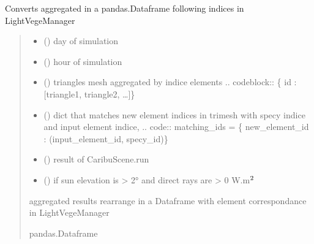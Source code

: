 \documentclass[letterpaper,10pt,english]{sphinxmanual}
\begin{document}
\begin{fulllineitems}
\label{\detokenize{reference:outputs.out_caribu_elements}}
\pysigstartsignatures
{}
\pysigstopsignatures
\sphinxAtStartPar
Converts aggregated in a pandas.Dataframe following indices in LightVegeManager
\begin{quote}\begin{description}
\begin{itemize}
\item {} 
\sphinxAtStartPar
{} () \textendash{} day of simulation

\item {} 
\sphinxAtStartPar
{} () \textendash{} hour of simulation

\item {} 
\sphinxAtStartPar
{} () \textendash{} triangles mesh aggregated by indice elements
.. code\sphinxhyphen{}block:: \{ id : {[}triangle1, triangle2, …{]}\}

\item {} 
\sphinxAtStartPar
{} () \textendash{} dict that matches new element indices in trimesh with specy indice and
input element indice, 
.. code:: matching\_ids = \{ new\_element\_id : (input\_element\_id, specy\_id)\}

\item {} 
\sphinxAtStartPar
{} () \textendash{} result of CaribuScene.run

\item {} 
\sphinxAtStartPar
{} () \textendash{} if sun elevation is \textgreater{} 2° and direct rays are \textgreater{} 0 W.m\(\sp{\text{2}}\)

\end{itemize}

\sphinxAtStartPar
aggregated results rearrange in a Dataframe with element correspondance in LightVegeManager

\sphinxAtStartPar
pandas.Dataframe

\end{description}\end{quote}

\end{fulllineitems}
\end{document}
